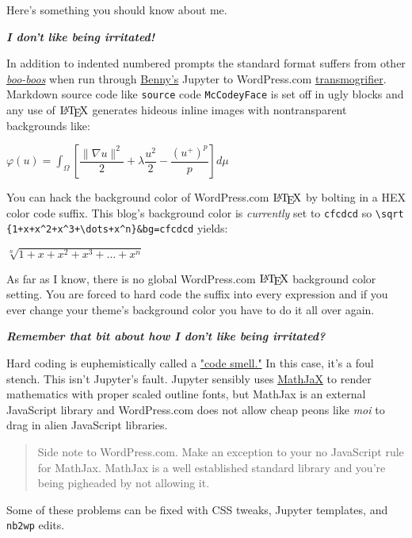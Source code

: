 Here's something you should know about me.

\textbf{\emph{I don't like being irritated!}}

In addition to indented numbered prompts the standard format suffers
from other
\href{https://www.dictionary.com/browse/boo-boo}{\emph{boo-boos}} when
run through \href{https://github.com/bennylp}{Benny's} Jupyter to
WordPress.com
\href{https://calvinandhobbes.fandom.com/wiki/Transmogrifier}{transmogrifier}.
Markdown source code like \texttt{source} code \texttt{McCodeyFace} is
set off in ugly blocks and any use of $\LaTeX$ generates hideous
inline images with nontransparent backgrounds like:

$\varphi (u) = \int_{\Omega} \left[
\dfrac{\|\nabla u\|^2}{2} +
\lambda\dfrac{u^2}{2} -
\dfrac{(u^+)^p}{p} \right] d\mu $

You can hack the background color of WordPress.com $\LaTeX$ by
bolting in a HEX color code suffix. This blog's background color is
\emph{currently} set to \texttt{cfcdcd} so
\texttt{\textbackslash{}sqrt
\{1+x+x\^{}2+x\^{}3+\textbackslash{}dots+x\^{}n\}\&bg=cfcdcd}
yields:

$\sqrt[n]{1+x+x^2+x^3+\dots+x^n}$

As far as I know, there is no global WordPress.com $\LaTeX$
background color setting. You are forced to hard code the suffix into
every expression and if you ever change your theme's background color
you have to do it all over again.

\textbf{\emph{Remember that bit about how I don't like being
irritated?}}

Hard coding is euphemistically called a
\href{https://www.codegrip.tech/productivity/everything-you-need-to-know-about-code-smells/}{"code
smell."} In this case, it's a foul stench. This isn't Jupyter's fault.
Jupyter sensibly uses \href{https://www.mathjax.org/}{MathJaX} to render
mathematics with proper scaled outline fonts, but MathJax is an external
JavaScript library and WordPress.com does not allow cheap peons like
\emph{moi} to drag in alien JavaScript libraries.

\begin{quote}
Side note to WordPress.com. Make an exception to your no JavaScript rule
for MathJax. MathJax is a well established standard library and you're
being pigheaded by not allowing it.
\end{quote}

Some of these problems can be fixed with CSS tweaks, Jupyter templates,
and \texttt{nb2wp} edits.

